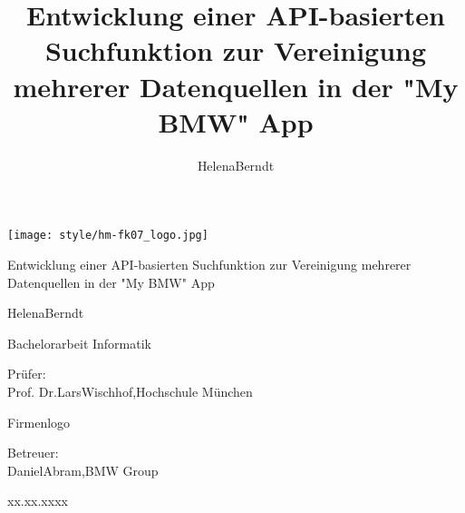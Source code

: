 \documentclass[
  12pt,
  a4paperpaper,
]{report}
\author{}
\date{}
\begin{document}
\newcommand{\titel}{Entwicklung einer API-basierten Suchfunktion zur Vereinigung mehrerer Datenquellen in der "My BMW" App}
\newcommand{\datum}{xx.xx.xxxx}

\newcommand{\aVorname}{Helena}
\newcommand{\aNachname}{Berndt}
\newcommand{\aGeburtsdatum}{01.03.2002}
\newcommand{\aInstitution}{Hochschule München}
\newcommand{\aStudiengruppe}{IF7}
\newcommand{\aSemester}{WS 2024/2025}

\newcommand{\aName}{\aVorname\space \aNachname}

\newcommand{\pTitle}{Prof. Dr.}
\newcommand{\pVorname}{Lars}
\newcommand{\pNachname}{Wischhof}
\newcommand{\pInstitution}{Hochschule München}

\newcommand{\bTitle}{}
\newcommand{\bVorname}{Daniel}
\newcommand{\bNachname}{Abram}
\newcommand{\bInstitution}{BMW Group}

\title{Entwicklung einer API-basierten Suchfunktion zur Vereinigung mehrerer Datenquellen in der "My BMW" App}
\author{Helena\space Berndt}

\begin{titlepage}
    \begin{center}

        \texttt{[image: style/hm-fk07\_logo.jpg]}

        \vspace*{1.0cm}

        \LARGE
        Entwicklung einer API-basierten Suchfunktion zur Vereinigung mehrerer Datenquellen in der "My BMW" App

        \vspace{1.5cm}

        \Large
        Helena\space Berndt

        \vspace{0.5cm}

        \normalsize
        Bachelorarbeit Informatik

        \vfill

        \normalsize
        Prüfer:\\
        Prof. Dr.\space Lars\space Wischhof,\space Hochschule München

        \vspace{0.5cm}

        Firmenlogo

        \normalsize
        Betreuer:\\
        \space Daniel\space Abram,\space BMW Group

        xx.xx.xxxx

    \end{center}
\end{titlepage}
\end{document}
